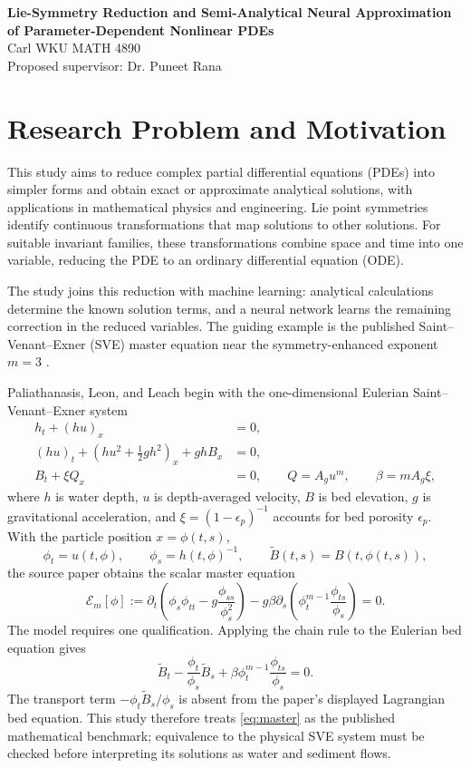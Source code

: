 \documentclass[12pt]{article}
\newcommand{\E}{\mathcal E}
\begin{document}
\begin{center}
\textbf{Lie-Symmetry Reduction and Semi-Analytical Neural Approximation\\
of Parameter-Dependent Nonlinear PDEs}\\[4pt]
Carl \quad WKU MATH 4890\\
Proposed supervisor: Dr. Puneet Rana
\end{center}

\section{Research Problem and Motivation}

This study aims to reduce complex partial differential equations (PDEs) into simpler forms and obtain exact or approximate analytical solutions, with applications in mathematical physics and engineering. Lie point symmetries identify continuous transformations that map solutions to other solutions. For suitable invariant families, these transformations combine space and time into one variable, reducing the PDE to an ordinary differential equation (ODE).

The study joins this reduction with machine learning: analytical calculations determine the known solution terms, and a neural network learns the remaining correction in the reduced variables. The guiding example is the published Saint--Venant--Exner (SVE) master equation near the symmetry-enhanced exponent $m=3$ \cite{lagrange}.

Paliathanasis, Leon, and Leach begin with the one-dimensional Eulerian
Saint--Venant--Exner system
\begin{align}
h_t+(hu)_x&=0, \nonumber\\
(hu)_t+\left(hu^2+\tfrac12gh^2\right)_x+ghB_x&=0, \label{eq:eulerian}\\
B_t+\xi Q_x&=0,\qquad Q=A_g u^m,\qquad
\beta=mA_g\xi, \nonumber
\end{align}
where $h$ is water depth, $u$ is depth-averaged velocity, $B$ is bed
elevation, $g$ is gravitational acceleration, and $\xi=(1-\epsilon_p)^{-1}$ accounts for bed porosity $\epsilon_p$. With the particle position $x=\phi(t,s)$,
\[
\phi_t=u(t,\phi),\qquad \phi_s=h(t,\phi)^{-1},
\qquad \widetilde B(t,s)=B(t,\phi(t,s)),
\]
the source paper obtains the scalar master equation
\begin{equation}
\E_m[\phi]:=
\partial_t\left(\phi_s\phi_{tt}-g\frac{\phi_{ss}}{\phi_s^2}\right)
-g\beta\partial_s\left(\phi_t^{m-1}\frac{\phi_{ts}}{\phi_s}\right)=0.
\label{eq:master}
\end{equation}
The model requires one qualification. Applying the chain rule to the Eulerian bed equation gives
\begin{equation}
\widetilde B_t-\frac{\phi_t}{\phi_s}\widetilde B_s
+\beta\phi_t^{m-1}\frac{\phi_{ts}}{\phi_s}=0.
\label{eq:lag-exner-audit}
\end{equation}
The transport term $-\phi_t\widetilde B_s/\phi_s$ is absent from the paper's displayed Lagrangian bed equation. This study therefore treats \eqref{eq:master} as the published mathematical benchmark; equivalence to the physical SVE system must be checked before interpreting its solutions as water and sediment flows.
\end{document}
